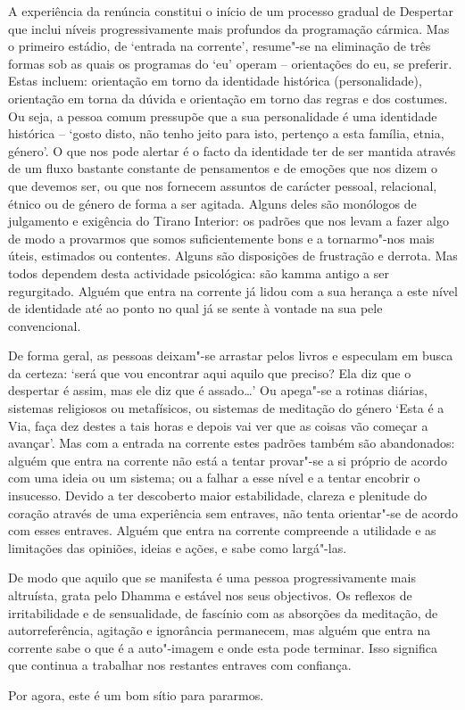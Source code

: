 A experiência da renúncia constitui o início de um processo gradual de Despertar
que inclui níveis progressivamente mais profundos da programação cármica. Mas o
primeiro estádio, de `entrada na corrente', resume"-se na eliminação de três
formas sob as quais os programas do `eu' operam -- orientações do eu, se
preferir. Estas incluem: orientação em torno da identidade histórica
(personalidade), orientação em torna da dúvida e orientação em torno das regras
e dos costumes. Ou seja, a pessoa comum pressupõe que a sua personalidade é uma
identidade histórica -- `gosto disto, não tenho jeito para isto, pertenço a esta
família, etnia, género'. O que nos pode alertar é o facto da identidade ter de
ser mantida através de um fluxo bastante constante de pensamentos e de emoções
que nos dizem o que devemos ser, ou que nos fornecem assuntos de carácter
pessoal, relacional, étnico ou de género de forma a ser agitada. Alguns deles
são monólogos de julgamento e exigência do Tirano Interior: os padrões que nos
levam a fazer algo de modo a provarmos que somos suficientemente bons e a
tornarmo"-nos mais úteis, estimados ou contentes. Alguns são disposições de
frustração e derrota. Mas todos dependem desta actividade psicológica: são kamma
antigo a ser regurgitado. Alguém que entra na corrente já lidou com a sua
herança a este nível de identidade até ao ponto no qual já se sente à vontade na
sua pele convencional.

De forma geral, as pessoas deixam"-se arrastar pelos livros e especulam em busca
da certeza: `será que vou encontrar aqui aquilo que preciso? Ela diz que o
despertar é assim, mas ele diz que é assado\ldots{}' Ou apega"-se a rotinas
diárias, sistemas religiosos ou metafísicos, ou sistemas de meditação do género
`Esta é a Via, faça dez destes a tais horas e depois vai ver que as coisas vão
começar a avançar'. Mas com a entrada na corrente estes padrões também são
abandonados: alguém que entra na corrente não está a tentar provar"-se a si
próprio de acordo com uma ideia ou um sistema; ou a falhar a esse nível e a
tentar encobrir o insucesso. Devido a ter descoberto maior estabilidade, clareza
e plenitude do coração através de uma experiência sem entraves, não tenta
orientar"-se de acordo com esses entraves. Alguém que entra na corrente
compreende a utilidade e as limitações das opiniões, ideias e ações, e sabe como
largá"-las.

De modo que aquilo que se manifesta é uma pessoa progressivamente mais
altruísta, grata pelo Dhamma e estável nos seus objectivos. Os reflexos de
irritabilidade e de sensualidade, de fascínio com as absorções da meditação, de
autorreferência, agitação e ignorância permanecem, mas alguém que entra na
corrente sabe o que é a auto"-imagem e onde esta pode terminar. Isso significa
que continua a trabalhar nos restantes entraves com confiança.

Por agora, este é um bom sítio para pararmos.
